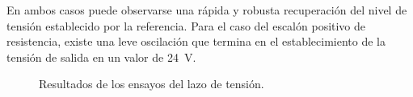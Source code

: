 En ambos casos puede observarse una rápida y robusta recuperación del nivel de tensión establecido por la referencia. Para el caso del escalón positivo de resistencia, existe una leve oscilación que termina en el establecimiento de la tensión de salida en un valor de \SI{24}{\volt}.

\begin{figure}[hbt!]
  \centering
  \caption{Resultados de los ensayos del lazo de tensión.}
  \label{var-r-lazo-tension}
\end{figure}

\newpage